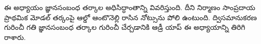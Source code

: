 \documentclass[../../../include/open-logic-chapter]{subfiles}
\begin{document}

\begin{editorial}
  ఈ అధ్యాయం జ్ఞానసంబంధ తర్కాల అధిసిద్ధాంతాన్ని వివరిస్తుంది.
  దీని నిర్మాణం సాంప్రదాయ ప్రాథమిక మోడల్ తర్కంపై ఆల్డో ఆంటొనెల్లి
  రాసిన నోట్సును పోలి ఉంటుంది. ద్విసమానుకరణ గురించీ గతి జ్ఞానసంబంధ
  తర్కాల గురించీ చేర్చడానికి ఆడ్రీ యాప్ ఈ అధ్యాయాన్ని తిరిగి రాశారు.
\end{editorial}



\OLEndChapterHook
\end{document}
